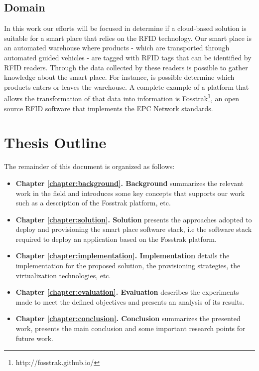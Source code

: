 \subsection{Domain}
\label{sub:domain}
In this work our efforts will be focused in determine if a cloud-based solution is suitable
for a smart place that relies on the \gls{RFID} technology. Our smart place is an automated warehouse
where products - which are transported through automated guided vehicles - are tagged with \gls{RFID}
tags that can be identified by \gls{RFID} readers. Through the data collected by these readers is
possible to gather knowledge about the smart place. For instance, is possible determine which products
enters or leaves the warehouse. A complete example of a platform that allows the transformation of
that data into information is Fosstrak\footnote{http://fosstrak.github.io/}, an open source \gls{RFID}
software that implements the \gls{EPC} Network standards.\\

\section{Thesis Outline}
\label{section:outline}
The remainder of this document is organized as follows:
\begin{itemize}
  \item \textbf{Chapter \ref{chapter:background}. Background} summarizes the relevant work in the field and
  introduces some key concepts that supports our work such as a description of the Fosstrak platform, etc.
  \item \textbf{Chapter \ref{chapter:solution}. Solution} presents the approaches adopted to deploy
  and provisioning the smart place software stack, i.e the software stack required to deploy
  an application based on the Fosstrak platform.
  \item \textbf{Chapter \ref{chapter:implementation}. Implementation} details the implementation
  for the proposed solution, the provisioning strategies, the virtualization technologies, etc.
  \item \textbf{Chapter \ref{chapter:evaluation}. Evaluation} describes the experiments made to meet
  the defined objectives and presents an analysis of its results.
  \item \textbf{Chapter \ref{chapter:conclusion}. Conclusion} summarizes the presented work,
  presents the main conclusion and some important research points for future work.
\end{itemize}
